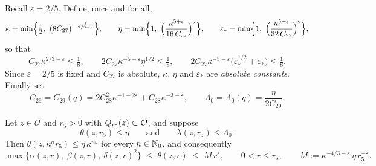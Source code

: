 \documentclass[11pt,reqno]{amsart}
\begin{document}
\begin{convention}\label{conv:kappa}
Recall $\varepsilon=2/5$. Define, once and for all,
\begin{equation}\label{eq:kappa-eta}
  \kappa=\min\Bigl\{\tfrac12,\ \bigl(8C_{27}\bigr)^{-\frac{1}{2/3-\varepsilon}}\Bigr\},
  \qquad
  \eta=\min\Bigl\{1,\ \Bigl(\frac{\kappa^{5+\varepsilon}}{16\,C_{27}}\Bigr)^{2}\Bigr\},
  \qquad
  \varepsilon_{*}=\min\Bigl\{1,\ \Bigl(\frac{\kappa^{5+\varepsilon}}{32\,C_{27}}\Bigr)^{2}\Bigr\},
\end{equation}
so that
\begin{equation}\label{eq:kappa-props}
  C_{27}\kappa^{2/3-\varepsilon}\le\tfrac18,
  \qquad
  2C_{27}\kappa^{-5-\varepsilon}\eta^{1/2}\le\tfrac18,
  \qquad
  2C_{27}\kappa^{-5-\varepsilon}\bigl(\varepsilon_{*}^{1/2}+\varepsilon_{*}\bigr)\le\tfrac18 .
\end{equation}
Since $\varepsilon=2/5$ is fixed and $C_{27}$ is absolute, $\kappa$, $\eta$ and
$\varepsilon_{*}$ are \emph{absolute constants}. Finally set
\begin{equation}\label{eq:C29}
  C_{29}=C_{29}(q)=2C_{28}^{2}\kappa^{-1-2\varepsilon}+C_{28}\kappa^{-3-\varepsilon},
  \qquad
  \Lambda_{0}=\Lambda_{0}(q)=\frac{\eta}{2C_{29}} .
\end{equation}
\end{convention}

\begin{proposition}\label{prop:iteration}
Let $z\in\mathcal{O}$ and $r_{5}>0$ with $Q_{r_{5}}(z)\subset\mathcal{O}$, and
suppose
\begin{equation}\label{eq:iteration-hyp}
  \theta(z,r_{5})\le\eta
  \qquad\text{and}\qquad
  \lambda(z,r_{5})\le\Lambda_{0}.
\end{equation}
Then $\theta(z,\kappa^{n}r_{5})\le\eta\,\kappa^{n\varepsilon}$ for every
$n\in\mathbb{N}_{0}$, and consequently
\begin{equation}\label{eq:iteration-concl}
  \max\bigl\{\alpha(z,r),\ \beta(z,r),\ \delta(z,r)^{2}\bigr\}
  \;\le\;\theta(z,r)\;\le\;M\,r^{\varepsilon},
  \qquad 0<r\le r_{5},\qquad
  M:=\kappa^{-4/3-\varepsilon}\,\eta\,r_{5}^{-\varepsilon}.
\end{equation}
\end{proposition}
\end{document}
